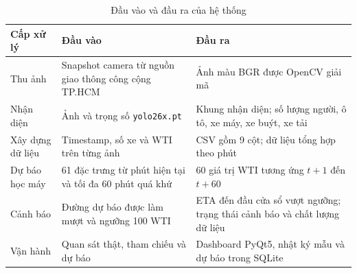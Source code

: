 \begin{table}[htbp]
        \centering
        \caption{Đầu vào và đầu ra của hệ thống}
        \vspace{0.2cm}
        \begin{tabular}{|p{3cm}|p{6cm}|p{6cm}|}
            \hline
            \textbf{Cấp xử lý} & \textbf{Đầu vào} & \textbf{Đầu ra} \\
            \hline
            Thu ảnh & Snapshot camera từ nguồn giao thông công cộng TP.HCM & Ảnh màu BGR được OpenCV giải mã \\
            \hline
            Nhận diện & Ảnh và trọng số \texttt{yolo26x.pt} & Khung nhận diện; số lượng người, ô tô, xe máy, xe buýt, xe tải \\
            \hline
            Xây dựng dữ liệu & Timestamp, số xe và WTI trên từng ảnh & CSV gồm 9 cột; dữ liệu tổng hợp theo phút \\
            \hline
            Dự báo học máy & 61 đặc trưng từ phút hiện tại và tối đa 60 phút quá khứ & 60 giá trị WTI tương ứng $t+1$ đến $t+60$ \\
            \hline
            Cảnh báo & Đường dự báo được làm mượt và ngưỡng 100 WTI & ETA đến đầu cửa sổ vượt ngưỡng; trạng thái cảnh báo và chất lượng dữ liệu \\
            \hline
            Vận hành & Quan sát thật, tham chiếu và dự báo & Dashboard PyQt5, nhật ký mẫu và dự báo trong SQLite \\
            \hline
        \end{tabular}
    \end{table}